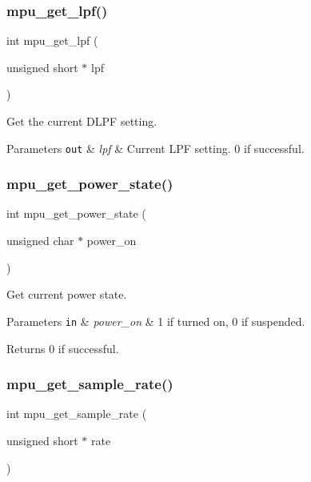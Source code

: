 \subsubsection{mpu\+\_\+get\+\_\+lpf()}
{\footnotesize\ttfamily int mpu\+\_\+get\+\_\+lpf (\begin{DoxyParamCaption}\item[{unsigned short $\ast$}]{lpf }\end{DoxyParamCaption})}



Get the current D\+L\+PF setting. 


\begin{DoxyParams}[1]{Parameters}
\mbox{\tt out}  & {\em lpf} & Current L\+PF setting. 0 if successful. \\
\hline
\end{DoxyParams}
\mbox{\label{group___d_r_i_v_e_r_s_gaec8fa7a067988d174516bb735a4a0bc9}} 
\subsubsection{mpu\+\_\+get\+\_\+power\+\_\+state()}
{\footnotesize\ttfamily int mpu\+\_\+get\+\_\+power\+\_\+state (\begin{DoxyParamCaption}\item[{unsigned char $\ast$}]{power\+\_\+on }\end{DoxyParamCaption})}



Get current power state. 


\begin{DoxyParams}[1]{Parameters}
\mbox{\tt in}  & {\em power\+\_\+on} & 1 if turned on, 0 if suspended. \\
\hline
\end{DoxyParams}
\begin{DoxyReturn}{Returns}
0 if successful. 
\end{DoxyReturn}
\mbox{\label{group___d_r_i_v_e_r_s_ga2487dd551b701c1c7ed4d6335f02b2f1}} 
\subsubsection{mpu\+\_\+get\+\_\+sample\+\_\+rate()}
{\footnotesize\ttfamily int mpu\+\_\+get\+\_\+sample\+\_\+rate (\begin{DoxyParamCaption}\item[{unsigned short $\ast$}]{rate }\end{DoxyParamCaption})}



